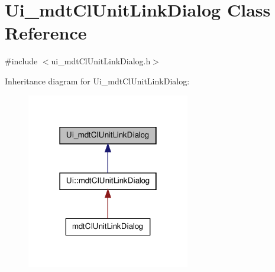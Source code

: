 \hypertarget{class_ui__mdt_cl_unit_link_dialog}{\section{Ui\-\_\-mdt\-Cl\-Unit\-Link\-Dialog Class Reference}
\label{class_ui__mdt_cl_unit_link_dialog}
}


{\ttfamily \#include $<$ui\-\_\-mdt\-Cl\-Unit\-Link\-Dialog.\-h$>$}



Inheritance diagram for Ui\-\_\-mdt\-Cl\-Unit\-Link\-Dialog\-:
\nopagebreak
\begin{figure}[H]
\begin{center}
\leavevmode
\includegraphics[width=202pt]{class_ui__mdt_cl_unit_link_dialog__inherit__graph}
\end{center}
\end{figure}



